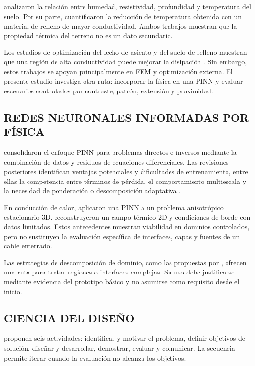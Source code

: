 \textcite[1,6--9]{khumalo2025} analizaron la relación entre humedad, resistividad, profundidad y temperatura del suelo. Por su parte, \textcite[1,10,16]{kim2025} cuantificaron la reducción de temperatura obtenida con un material de relleno de mayor conductividad. Ambos trabajos muestran que la propiedad térmica del terreno no es un dato secundario.

Los estudios de optimización del lecho de asiento y del suelo de relleno muestran que una región de alta conductividad puede mejorar la disipación \parencites[1--3]{oclon2015}[1--4]{atoccsa2024}. Sin embargo, estos trabajos se apoyan principalmente en FEM y optimización externa. El presente estudio investiga otra ruta: incorporar la física en una PINN y evaluar escenarios controlados por contraste, patrón, extensión y proximidad.

\subsection{REDES NEURONALES INFORMADAS POR FÍSICA}

\textcite[686--690]{raissi2019} consolidaron el enfoque PINN para problemas directos e inversos mediante la combinación de datos y residuos de ecuaciones diferenciales. Las revisiones posteriores identifican ventajas potenciales y dificultades de entrenamiento, entre ellas la competencia entre términos de pérdida, el comportamiento multiescala y la necesidad de ponderación o descomposición adaptativa \parencites[1--2,14--17]{lawal2022}[2--6]{ren2025}.

En conducción de calor, \textcite[1,3,17]{xing2023} aplicaron una PINN a un problema anisotrópico estacionario 3D. \textcite[1,3,16]{pan2025} reconstruyeron un campo térmico 2D y condiciones de borde con datos limitados. Estos antecedentes muestran viabilidad en dominios controlados, pero no sustituyen la evaluación específica de interfaces, capas y fuentes de un cable enterrado.

Las estrategias de descomposición de dominio, como las propuestas por \textcite[1--2]{shukla2021}, ofrecen una ruta para tratar regiones o interfaces complejas. Su uso debe justificarse mediante evidencia del prototipo básico y no asumirse como requisito desde el inicio.

\subsection{CIENCIA DEL DISEÑO}

\textcite[54--56]{peffers2007} proponen seis actividades: identificar y motivar el problema, definir objetivos de solución, diseñar y desarrollar, demostrar, evaluar y comunicar. La secuencia permite iterar cuando la evaluación no alcanza los objetivos.

